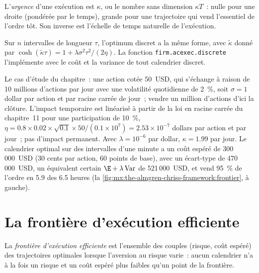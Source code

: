 \begin{definition}[Urgence]\label{def:mx:the-almgren-chriss-framework:urgency}
L'\emph{urgence} d'une exécution est $\kappa$, ou le nombre sans dimension $\kappa T$~: nulle pour une droite (pondérée par le temps), grande pour une
trajectoire qui vend l'essentiel de l'ordre tôt. Son inverse est l'échelle de temps naturelle de l'exécution.
\end{definition}

Sur $n$ intervalles de longueur $\tau$, l'optimum discret a la même forme, avec $\tilde\kappa$ donné par $\cosh(\tilde\kappa\tau)=1+\lambda\sigma^2\tau^2/(2\eta)$.
La fonction \texttt{firm.acexec.discrete} l'implémente avec le coût et la variance de tout calendrier discret.

\label{lst:mx:the-almgren-chriss-framework:ac}

Le cas d'étude du chapitre~: une action cotée 50~USD, qui s'échange à raison de 10 millions d'actions par jour avec une volatilité quotidienne de 2~\%, soit $\sigma=1$ dollar par action et par racine carrée de jour~;
vendre un million d'actions d'ici la clôture. L'impact temporaire est linéarisé à partir de la loi en racine carrée du chapitre~11 pour une participation de 10~\%,
$\eta=0.8\times0.02\times\sqrt{0.1}\times50/(0.1\times10^7)=2.53\times10^{-7}$ dollars par action et par jour~; pas d'impact permanent. Avec $\lambda=10^{-6}$ par
dollar, $\kappa=1.99$ par jour. Le calendrier optimal sur des intervalles d'une minute a un coût espéré de 300\,000~USD (30 cents par action, 60 points de base), avec un
écart-type de 470\,000~USD, un équivalent certain $\E+\lambda\operatorname{Var}$ de 521\,000~USD, et vend 95~\% de l'ordre en 5.9 des 6.5 heures
(la \cref{fig:mx:the-almgren-chriss-framework:frontier}, à gauche).

\section{La frontière d'exécution efficiente}

\begin{definition}\label{def:mx:the-almgren-chriss-framework:frontier}
La \emph{frontière d'exécution efficiente} est l'ensemble des couples (risque, coût espéré) des trajectoires optimales lorsque l'aversion
au risque varie~: aucun calendrier n'a à la fois un risque et un coût espéré plus faibles qu'un point de la frontière.
\end{definition}

